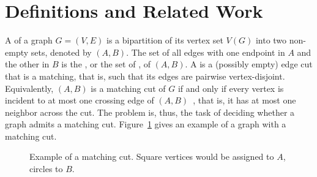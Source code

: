 \section{Definitions and Related Work}

A  of a graph $G = (V, E)$ is a bipartition of its vertex set $V(G)$ into two non-empty sets, denoted by $(A,B)$.
The set of all edges with one endpoint in $A$ and the other in $B$ is the , or the set of , of $(A,B)$.
A  is a (possibly empty) edge cut that is a matching, that is, such that its edges are pairwise vertex-disjoint. Equivalently, $(A, B)$ is a matching cut of $G$ if and only if every vertex is incident to at most one crossing edge of $(A, B)$~\citep{matching_cut_graham, chvatal_matching_cut}, that is, it has at most one neighbor across the cut.
The  problem is, thus, the task of deciding whether a graph admits a matching cut.
Figure~\ref{fig:matching_cut} gives an example of a graph with a matching cut.



\begin{figure}[!htb]
        \centering
        \caption{Example of a matching cut. Square vertices would be assigned to $A$, circles to $B$.\label{fig:matching_cut}}
    \end{figure}


